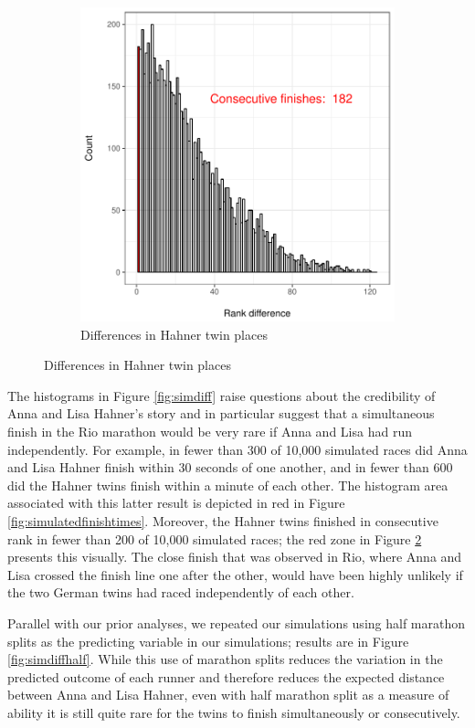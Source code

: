 \documentclass[12pt,titlepage]{article}
\begin{document}
\begin{figure}[!ht]
\begin{subfigure}{.45\textwidth}
    \includegraphics[width=\textwidth, keepaspectratio]{simulated_rank_with_age.pdf}
    \caption{Differences in Hahner twin places}
    \label{fig:simulatedranks}
  \end{subfigure}
\end{figure}

The histograms in Figure \ref{fig:simdiff} raise questions about the
credibility of Anna and Lisa Hahner's story and in particular suggest
that a simultaneous finish in the Rio marathon would be very rare if
Anna and Lisa had run independently. For example, in fewer than 300 of
10,000 simulated races did Anna and Lisa Hahner finish within 30
seconds of one another, and in fewer than 600 did the Hahner twins
finish within a minute of each other.  The histogram area associated
with this latter result is depicted in red in Figure
\ref{fig:simulatedfinishtimes}.  Moreover, the Hahner twins finished
in consecutive rank in fewer than 200 of 10,000 simulated races; the
red zone in Figure \ref{fig:simulatedranks} presents this visually.
The close finish that was observed in Rio, where Anna and Lisa crossed
the finish line one after the other, would have been highly unlikely
if the two German twins had raced independently of each other.

Parallel with our prior analyses, we repeated our simulations using
half marathon splits as the predicting variable in our simulations;
results are in Figure \ref{fig:simdiffhalf}.  While this use of
marathon splits reduces the variation in the predicted outcome of each
runner and therefore reduces the expected distance between Anna and
Lisa Hahner, even with half marathon split as a measure of ability it
is still quite rare for the twins to finish simultaneously or
consecutively.
\end{document}
